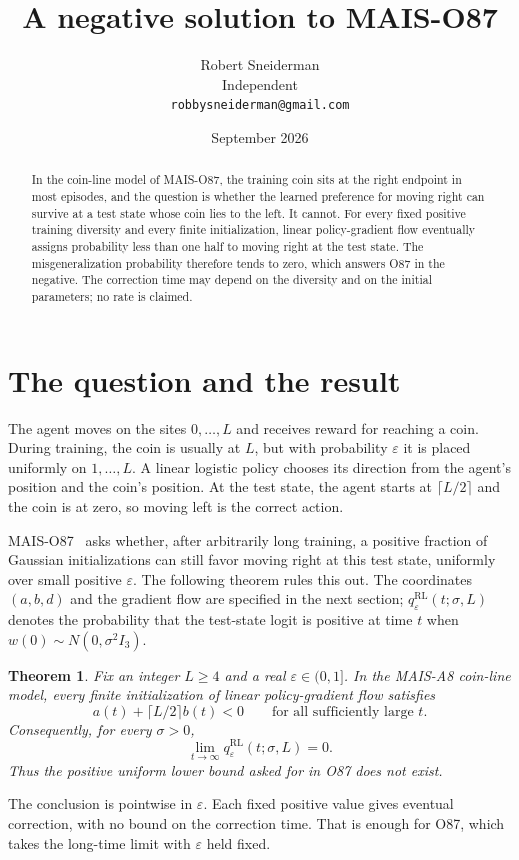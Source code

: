 \documentclass[11pt]{article}
\title{A negative solution to MAIS-O87}
\author{Robert Sneiderman\\Independent\\\texttt{robbysneiderman@gmail.com}}
\date{September 2026}
\newtheorem{theorem}{Theorem}
\newcommand{\eps}{\varepsilon}
\begin{document}
\maketitle
\begin{abstract}
In the coin-line model of MAIS-O87, the training coin sits at the right
endpoint in most episodes, and the question is whether the learned preference
for moving right can survive at a test state whose coin lies to the left.
It cannot. For every fixed positive training diversity and every finite
initialization, linear policy-gradient flow eventually assigns probability
less than one half to moving right at the test state. The misgeneralization
probability therefore tends to zero, which answers O87 in the negative. The
correction time may depend on the diversity and on the initial parameters;
no rate is claimed.
\end{abstract}

\section{The question and the result}
The agent moves on the sites $0,\ldots,L$ and receives reward for reaching
a coin. During training, the coin is usually at $L$, but with probability
$\eps$ it is placed uniformly on $1,\ldots,L$. A linear logistic policy
chooses its direction from the agent's position and the coin's position.
At the test state, the agent starts at $\lceil L/2\rceil$ and the coin is
at zero, so moving left is the correct action.

MAIS-O87~\cite{mais-o87} asks whether, after arbitrarily long training, a positive
fraction of Gaussian initializations can still favor moving right at this
test state, uniformly over small positive $\eps$. The following theorem
rules this out. The coordinates $(a,b,d)$ and the gradient flow are specified
in the next section; $q^{\mathrm{RL}}_\eps(t;\sigma,L)$ denotes the probability
that the test-state logit is positive at time $t$ when
$w(0)\sim N(0,\sigma^2 I_3)$.

\begin{theorem}\label{thm:main}
Fix an integer $L\ge4$ and a real $\eps\in(0,1]$. In the MAIS-A8
coin-line model, every finite initialization of linear policy-gradient flow
satisfies
\[
 a(t)+\lceil L/2\rceil b(t)<0\qquad\text{for all sufficiently large }t.
\]
Consequently, for every $\sigma>0$,
\[
 \lim_{t\to\infty}q^{\mathrm{RL}}_\eps(t;\sigma,L)=0.
\]
Thus the positive uniform lower bound asked for in O87 does not exist.
\end{theorem}
The conclusion is pointwise in $\eps$. Each fixed positive value gives
eventual correction, with no bound on the correction time. That is enough
for O87, which takes the long-time limit with $\eps$ held fixed.
\end{document}
